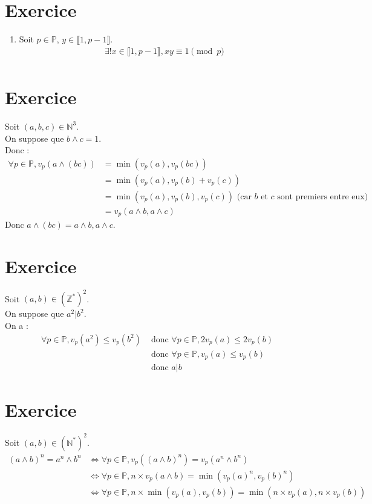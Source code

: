 \documentclass{report}
\begin{document}
\setcounter{section}{10}
\section{Exercice}

\begin{enumerate}
    \item Soit $p \in \mathbb{P}$, $y \in \llbracket 1, p-1 \rrbracket$. \\
    \begin{align*}
        \exists ! x \in \llbracket 1, p-1 \rrbracket, xy \equiv 1 \pmod{p} \\
    \end{align*}
\end{enumerate}


\setcounter{section}{11}
\section{Exercice}
Soit $(a,b,c) \in \mathbb{N}^3$. \\
On suppose que $b \wedge c = 1$. \\
Donc : 
\begin{align*}
    \forall p \in \mathbb{P}, v_p(a \wedge (bc)) &= \min(v_p(a), v_p(bc)) \\
    &= \min(v_p(a), v_p(b) + v_p(c)) \\
    &= \min(v_p(a), v_p(b), v_p(c)) \text{ (car $b$ et $c$ sont premiers entre eux)}\\
    &= v_p(a \wedge b, a \wedge c)
\end{align*}
Donc $\boxed{a \wedge (bc) = a \wedge b, a \wedge c}$.

\section{Exercice}
Soit $(a,b) \in (\mathbb{Z}^*)^2$. \\
On suppose que $a^2 | b^2$. \\
On a : 
\begin{align*}
    \forall p \in \mathbb{P}, v_p(a^2) \leq v_p(b^2) &\text{ donc } \forall p \in \mathbb{P}, 2v_p(a) \leq 2v_p(b) \\
    &\text{ donc } \forall p \in \mathbb{P}, v_p(a) \leq v_p(b) \\
    &\text{ donc } a | b
\end{align*}

\section{Exercice}
Soit $(a,b) \in (\mathbb{N}^*)^2$. \\
\begin{align*}
    (a \wedge b)^n = a^n \wedge b^n &\Leftrightarrow \forall p \in \mathbb{P}, v_p((a \wedge b)^n) = v_p(a^n \wedge b^n) \\
    &\Leftrightarrow \forall p \in \mathbb{P}, n \times v_p(a \wedge b) = \min(v_p(a)^n, v_p(b)^n) \\
    &\Leftrightarrow \forall p \in \mathbb{P},n \times \min(v_p(a), v_p(b)) = \min(n \times v_p(a), n \times v_p(b)) \\
\end{align*}
\end{document}
